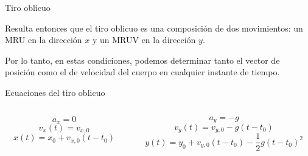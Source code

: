 \documentclass[11pt,handout,aspectratio=1610]{beamer}
\newcommand{\vs}{\vspace{11pt}}
\begin{document}
\begin{frame}{Tiro oblicuo}

    Resulta entonces que el tiro oblicuo es una composición de dos movimientos: un MRU en la dirección $x$ y un MRUV en la dirección $y$.

    \vs 

    Por lo tanto, en estas condiciones, podemos determinar tanto el vector de posición como el de velocidad del cuerpo en cualquier instante de tiempo.

    \vs

    \begin{block}{Ecuaciones del tiro oblicuo}
        \begin{columns}
            \begin{column}{0.5\textwidth}
                $$a_x = 0$$
                $$v_x (t) = v_{x,0}$$
                $$x (t) = x_0 + v_{x,0} \left(t - t_0\right)$$
            \end{column}
            \begin{column}{0.5\textwidth}
                $$a_y = - g$$
                $$v_y (t) = v_{y,0} - g \left(t-t_0\right)$$
                $$y (t) = y_0 + v_{y,0} \left(t - t_0\right) - \frac{1}{2} g \left(t-t_0\right)^2$$
            \end{column}
        \end{columns}
    \end{block}



\end{frame}
\end{document}
